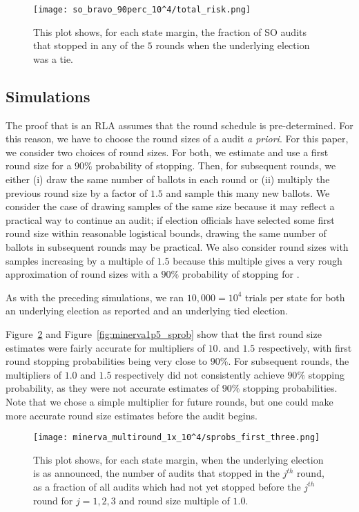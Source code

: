 \begin{figure}
\texttt{[image: so\_bravo\_90perc\_10^4/total\_risk.png]}
\caption{This plot shows, for each state margin,
the fraction of SO \BRAVO audits that stopped in any of the $5$ rounds when the underlying election was a tie.}
\label{fig:so_bravo_risk}
\end{figure}


\subsection{\Minerva Simulations}
The proof that \Minerva is an RLA \cite{usenix_minerva} assumes that the round schedule is pre-determined. For this reason, we have to choose the round sizes of a \Minerva 
audit {\em a priori}.
For this paper, we consider two choices of round sizes.
For both, we estimate and use a first round size 
for
a $90\%$ probability of stopping.
Then, for subsequent rounds, we either (i) 
draw the same number of ballots in each round or (ii)
multiply the previous round size by a factor of $1.5$ and 
sample this many new ballots.
We consider the case of drawing samples of the same size
because it may reflect a practical way to continue an
audit; if election officials have selected some first round size within
reasonable logistical bounds, drawing the same number of 
ballots in subsequent rounds may be practical.
We also consider round sizes with samples increasing by a multiple
of $1.5$ because this multiple gives a very rough approximation of 
round sizes with a $90\%$ probability of stopping for \Minerva. 

As with the preceding simulations, we ran $10,000=10^4$ trials
per state for both an underlying election as reported and an underlying tied election. 

Figure~\ref{fig:minerva1_sprob} and Figure~\ref{fig:minerva1p5_sprob} show that the first round size estimates were fairly accurate for multipliers of $10.$ and $1.5$ respectively, with first round stopping probabilities being very close to $90\%$. For subsequent rounds, the multipliers of $1.0$ and $1.5$ respectively did not consistently achieve $90\%$ stopping
probability, as they were not accurate estimates of $90\%$ stopping probabilities. Note that we chose a simple multiplier for future rounds, but one could make more accurate round size estimates before the audit begins. 

\begin{figure}
\texttt{[image: minerva\_multiround\_1x\_10^4/sprobs\_first\_three.png]}
\caption{This plot shows, for each state margin, when the underlying election is as announced, the number of \Minerva audits that stopped in the $j^{th}$ round,
as a fraction of all \Minerva audits which had not yet stopped before the $j^{th}$ round for $j=1,2,3$ and round size multiple of $1.0$.}
\label{fig:minerva1_sprob}
\end{figure}

